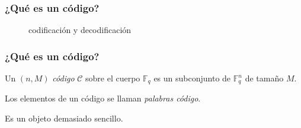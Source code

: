\documentclass[spanish,aspectratio=169]{beamer}
\begin{document}
\begin{frame}
  \frametitle{¿Qué es un código?}
  
  \begin{figure}[h]
    \centering
    \caption{codificación y decodificación}
  \end{figure}
  
\end{frame}

\begin{frame}
  \frametitle{¿Qué es un código?}
  
  \begin{definition}
    Un \((n, M)\) \emph{código} \(\mathcal C\) sobre el cuerpo \(\mathbb F_q\) es un \alert{subconjunto} de \(\mathbb F_q^n\) de tamaño \(M\).
  \end{definition}
  
  Los elementos de un código se llaman \emph{palabras código}.
  
  \vspace{2em}
  \textcolor{red}{\faTimesCircle} Es un objeto demasiado sencillo.
  
\end{frame}
\end{document}
